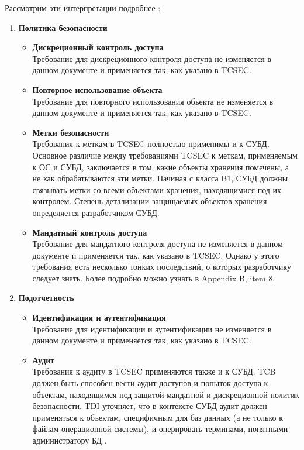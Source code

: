 Рассмотрим эти интерпретации подробнее \cite{PurpleBook}:
\begin{enumerate}
	\item \textbf{Политика безопасности}
	\begin{itemize}
		\item \textbf{Дискреционный контроль доступа}\\
		Требование для дискреционного контроля доступа не изменяется в данном документе и применяется так, как указано в TCSEC.
		\item \textbf{Повторное использование объекта}\\
		Требование для повторного использования объекта не изменяется в данном документе и применяется так, как указано в TCSEC.
		\item \textbf{Метки безопасности}\\
		Требования к меткам в TCSEC полностью применимы и к СУБД. Основное различие между требованиями TCSEC к меткам, применяемым к ОС и СУБД, заключается в том, какие объекты хранения помечены, а не как обрабатываются эти метки.
		Начиная с класса B1, СУБД должны связывать метки со всеми объектами хранения, находящимися под их контролем. Степень детализации защищаемых объектов хранения определяется разработчиком СУБД.
		\item \textbf{Мандатный контроль доступа}\\
		Требование для мандатного контроля доступа не изменяется в данном документе и применяется так, как указано в TCSEC. Однако у этого требования есть несколько тонких последствий, о которых разработчику следует знать. Более подробно можно узнать в \cite{PurpleBook} Appendix B, item 8.
	\end{itemize}
	\item \textbf{Подотчетность}
	\begin{itemize}
		\item \textbf{Идентификация и аутентификация}\\
		Требование для идентификации и аутентификации не изменяется в данном документе и применяется так, как указано в TCSEC.
		\item \textbf{Аудит}\\
		Требования к аудиту в TCSEC применяются также и к СУБД. TCB должен быть способен вести аудит доступов и попыток доступа к объектам, находящимся под защитой мандатной и дискреционной политик безопасности. TDI уточняет, что в контексте СУБД аудит должен применяться к объектам, специфичным для баз данных (а не только к файлам операционной системы), и оперировать терминами, понятными администратору БД \cite[IR-4]{PurpleBook}.

\end{itemize}
\end{enumerate}
